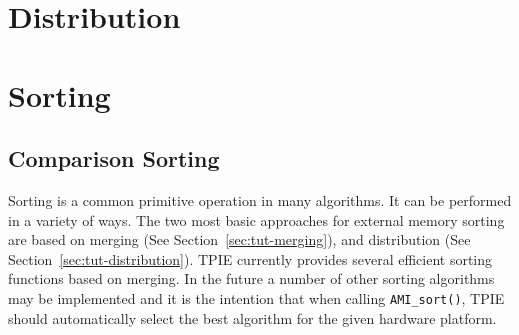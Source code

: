 



\section{Distribution} 

\tobewritten{}


%


\section{Sorting}
\label{sec:tut-sorting}


\subsection{Comparison Sorting} 

 Sorting is a common primitive operation
in many algorithms.  It can be performed in a variety of ways. The two
most basic approaches for external memory sorting are based on merging
(See Section~\ref{sec:tut-merging}), and distribution (See
Section~\ref{sec:tut-distribution}).
TPIE currently provides several efficient sorting functions
based on merging.  In the future a number of other sorting
algorithms may be implemented and it is the intention that
when calling \lstinline|AMI_sort()|, TPIE should automatically
select the best algorithm for the given hardware platform.

